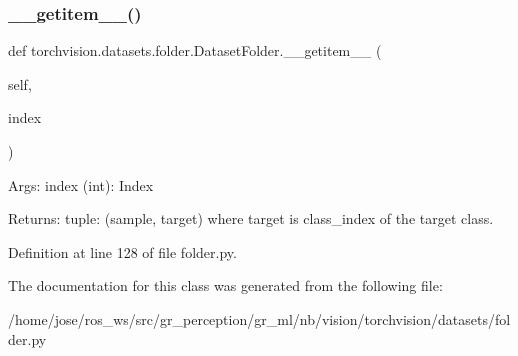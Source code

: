 \subsubsection{\texorpdfstring{\+\_\+\+\_\+getitem\+\_\+\+\_\+()}{\_\_getitem\_\_()}}
{\footnotesize\ttfamily def torchvision.\+datasets.\+folder.\+Dataset\+Folder.\+\_\+\+\_\+getitem\+\_\+\+\_\+ (\begin{DoxyParamCaption}\item[{}]{self,  }\item[{}]{index }\end{DoxyParamCaption})}

\begin{DoxyVerb}Args:
    index (int): Index

Returns:
    tuple: (sample, target) where target is class_index of the target class.
\end{DoxyVerb}
 

Definition at line 128 of file folder.\+py.



The documentation for this class was generated from the following file\+:\begin{DoxyCompactItemize}
\item 
/home/jose/ros\+\_\+ws/src/gr\+\_\+perception/gr\+\_\+ml/nb/vision/torchvision/datasets/folder.\+py\end{DoxyCompactItemize}
